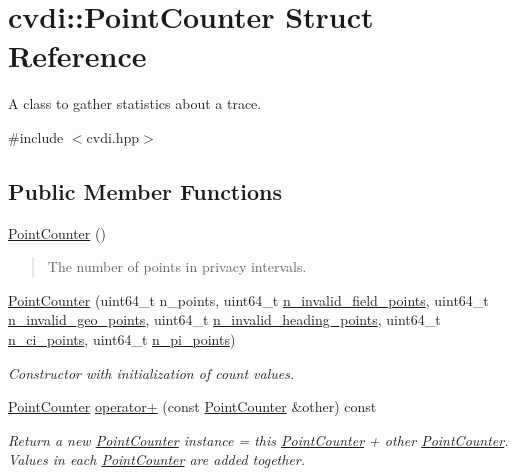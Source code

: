 \hypertarget{structcvdi_1_1PointCounter}{}\section{cvdi\+:\+:Point\+Counter Struct Reference}
\label{structcvdi_1_1PointCounter}


A class to gather statistics about a trace.  




{\ttfamily \#include $<$cvdi.\+hpp$>$}

\subsection*{Public Member Functions}
\begin{DoxyCompactItemize}
\item 
\hyperlink{structcvdi_1_1PointCounter_a60c7c3b39c50542496711d133e543cdd}{Point\+Counter} ()
\begin{DoxyCompactList}\small\item\em \begin{quote}
The number of points in privacy intervals. \end{quote}
\end{DoxyCompactList}\item 
\hyperlink{structcvdi_1_1PointCounter_a615e1568bf8f36be3afc1e2c61654001}{Point\+Counter} (uint64\+\_\+t n\+\_\+points, uint64\+\_\+t \hyperlink{structcvdi_1_1PointCounter_ab329abe5fe52bd787dc2dc59afc03bc7}{n\+\_\+invalid\+\_\+field\+\_\+points}, uint64\+\_\+t \hyperlink{structcvdi_1_1PointCounter_abccc4d82bf51f4cac2f8eb03b71f6b31}{n\+\_\+invalid\+\_\+geo\+\_\+points}, uint64\+\_\+t \hyperlink{structcvdi_1_1PointCounter_ab051246dc41739c3f5133d58c6857617}{n\+\_\+invalid\+\_\+heading\+\_\+points}, uint64\+\_\+t \hyperlink{structcvdi_1_1PointCounter_a663df3cac0f4920c7a7afc8feb002f1d}{n\+\_\+ci\+\_\+points}, uint64\+\_\+t \hyperlink{structcvdi_1_1PointCounter_a6eda31fe450485d5a90403aa22dc51b9}{n\+\_\+pi\+\_\+points})
\begin{DoxyCompactList}\small\item\em Constructor with initialization of count values. \end{DoxyCompactList}\item 
\hyperlink{structcvdi_1_1PointCounter}{Point\+Counter} \hyperlink{structcvdi_1_1PointCounter_a274b6da1ad2f5afb2b7d7d2fb9adf1cd}{operator+} (const \hyperlink{structcvdi_1_1PointCounter}{Point\+Counter} \&other) const 
\begin{DoxyCompactList}\small\item\em Return a new \hyperlink{structcvdi_1_1PointCounter}{Point\+Counter} instance = this \hyperlink{structcvdi_1_1PointCounter}{Point\+Counter} + other \hyperlink{structcvdi_1_1PointCounter}{Point\+Counter}. Values in each \hyperlink{structcvdi_1_1PointCounter}{Point\+Counter} are added together. \end{DoxyCompactList}\end{DoxyCompactItemize}
